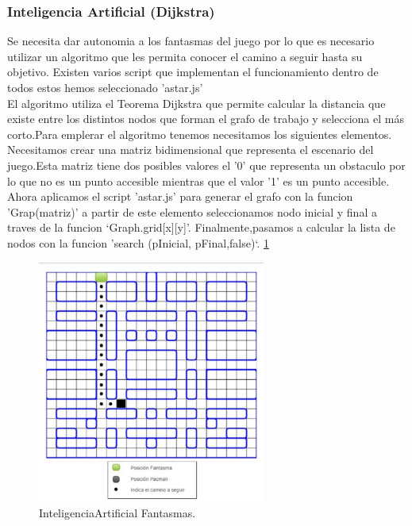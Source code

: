 \subsubsection{Inteligencia Artificial (Dijkstra)}
Se necesita dar  autonomia a los fantasmas del juego por lo que es necesario utilizar un algoritmo que les permita conocer el camino a seguir hasta su objetivo. Existen varios script que implementan el funcionamiento dentro de todos estos hemos seleccionado 'astar.js'\\
El algoritmo utiliza el Teorema Dijkstra que permite calcular la distancia que existe entre los distintos nodos que forman el grafo de trabajo y selecciona el más corto.Para emplerar el algoritmo tenemos necesitamos los siguientes elementos.\\
Necesitamos crear una matriz bidimensional que representa el escenario del juego.Esta matriz tiene dos posibles valores el '0' que representa un obstaculo por lo que no es un punto accesible mientras que el valor '1' es un punto accesible.\\
Ahora aplicamos el script 'astar.js' para generar el grafo con la funcion 'Grap(matriz)'  a partir de este elemento seleccionamos  nodo inicial y final  a traves de la funcion ‘Graph.grid[x][y]’. Finalmente,pasamos a calcular la lista de nodos con la funcion 'search (pInicial, pFinal,false)‘. \ref{fig:InteligenciaArtificial}   
 \begin{figure}[h]
\begin{center}
   \includegraphics[width=0.5\linewidth, height=8cm]{Figures/InteligenciaArtificial}
	\decoRule
	\caption[InteligenciaArtificial Fantasmas]{InteligenciaArtificial Fantasmas.}
\label{fig:InteligenciaArtificial}
\end{center}
\end{figure}

